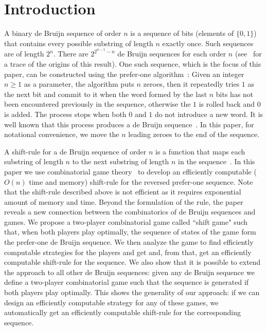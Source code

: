 \documentclass[final,12pt]{elsarticle}
\theoremstyle{definition} \newtheorem{definition}[theorem]{Definition} \newtheorem{observation}[theorem]{Observation} \newtheorem{example}[theorem]{Example} \newtheorem{remark}[theorem]{Remark} \newtheorem{corrolary}[theorem]{Corrolary}
\begin{document}
\section{Introduction}
\label{sec:introduction}

A binary de Bruijn sequence of order $n$ is a sequence of bits (elements of $\{0,1\}$) that contains every possible substring of length $n$ exactly once. Such sequences are of length $2^n$. There are $2^{2^{n-1}-n}$ de Bruijn sequences for each order $n$ (see~\cite{de1975acknowledgement} for a trace of the origins of this result). One such sequence, which is the focus of this paper, can be constructed using the prefer-one algorithm~\cite{Mar34}: Given an integer $n \geq 1$ as a parameter, the algorithm puts $n$ zeroes, then it repeatedly tries $1$ as the next bit and commit to it when the word formed by the last $n$ bits has not been encountered previously in the sequence, otherwise the $1$ is rolled back and $0$ is added. The process stops when both $0$ and $1$ do not introduce a new word. It is well known that this process produces a de Bruijn sequence~\cite{Mar34}. In this paper, for notational convenience, we move the $n$ leading zeroes to the end of the sequence.

A shift-rule for a de Bruijn sequence of order $n$ is a function that maps each substring of length $n$ to the next substring of length $n$ in the sequence~\cite{SAWADA2017524}. In this paper we use combinatorial game theory~\cite{berlekamp2003winning} to develop an efficiently computable ($O(n)$ time and memory) shift-rule for the reversed prefer-one sequence. Note that the shift-rule described above is not efficient as it requires exponential amount of memory and time. Beyond the formulation of the rule, the paper reveals a new connection between the combinatorics of de Bruijn sequences and games. We propose a two-player combinatorial game called ``shift game" such that, when both players play optimally, the sequence of states of the game form the prefer-one de Bruijn sequence. We then analyze the game to find efficiently computable strategies for the players and get and, from that, get an efficiently computable shift-rule for the sequence. We also show that it is possible to extend the approach to all other de Bruijn sequences: given any de Bruijn sequence we define a two-player combinatorial game such that the sequence is generated if both players play optimally. This shows the generality of our approach: if we can design an efficiently computable strategy for any of these games, we automatically get an efficiently computable shift-rule for the corresponding sequence.
\end{document}
